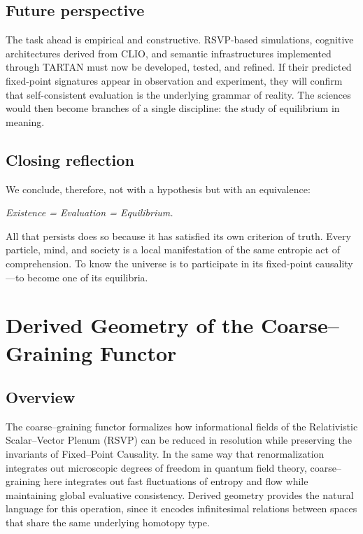 \documentclass[12pt,a4paper]{article}
\newcommand{\RSVP}{RSVP}              %
\newcommand{\CLIO}{CLIO}              %
\theoremstyle{plain}
\begin{document}
\subsection{Future perspective}
The task ahead is empirical and constructive.
RSVP-based simulations, cognitive architectures derived from \CLIO, and semantic infrastructures implemented through TARTAN must now be developed, tested, and refined.
If their predicted fixed-point signatures appear in observation and experiment, they will confirm that self-consistent evaluation is the underlying grammar of reality.
The sciences would then become branches of a single discipline: the study of equilibrium in meaning.

\subsection{Closing reflection}
We conclude, therefore, not with a hypothesis but with an equivalence:
\begin{center}
\textit{Existence = Evaluation = Equilibrium.}
\end{center}
All that persists does so because it has satisfied its own criterion of truth.
Every particle, mind, and society is a local manifestation of the same entropic act of comprehension.
To know the universe is to participate in its fixed-point causality—to become one of its equilibria.



\appendix
\section{Derived Geometry of the Coarse--Graining Functor}
\label{app:derived-geometry}

\subsection{Overview}
The coarse--graining functor formalizes how informational fields of the Relativistic Scalar--Vector Plenum (\RSVP) can be reduced in resolution while preserving the invariants of Fixed--Point Causality.  
In the same way that renormalization integrates out microscopic degrees of freedom in quantum field theory, coarse--graining here integrates out fast fluctuations of entropy and flow while maintaining global evaluative consistency.  
Derived geometry provides the natural language for this operation, since it encodes infinitesimal relations between spaces that share the same underlying homotopy type.
\end{document}
